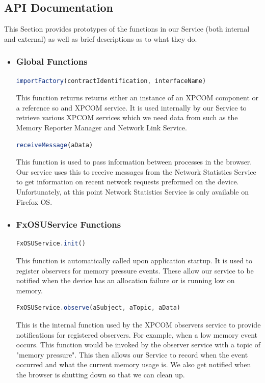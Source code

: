 \documentclass[12pt]{article}
\begin{document}
\subsection{API Documentation}
This Section provides prototypes of the functions in our Service (both internal and external) as well as brief descriptions as to what they do.
\begin{itemize}
\item \subsubsection{Global Functions}
\begin{lstlisting}[language=JavaScript]
importFactory(contractIdentification, interfaceName)
\end{lstlisting}
This function returns returns either an instance of an XPCOM component or a reference so and XPCOM service.  It is used internally by our Service to retrieve various XPCOM services which we need data from such as the Memory Reporter Manager and Network Link Service.  \\ 
\begin{lstlisting}[language=JavaScript]
receiveMessage(aData)
\end{lstlisting}
This function is used to pass information between processes in the browser.  Our service uses this to receive messages from the Network Statistics Service to get information on recent network requests preformed on the device.  Unfortunately, at this point Network Statistics Service is only available on Firefox OS. 
\item \subsubsection{FxOSUService Functions}
\begin{lstlisting}[language=JavaScript]
FxOSUService.init()
\end{lstlisting}  
This function is automatically called upon application startup.  It is used to register observers for memory pressure events.  These allow our service to be notified when the device has an allocation failure or is running low on memory.  \\
\begin{lstlisting}[language=JavaScript]
FxOSUService.observe(aSubject, aTopic, aData)
\end{lstlisting} 
This is the internal function used by the XPCOM observers service to provide notifications for registered observers. For example, when a low memory event occurs.  This function would be invoked by the observer service with a topic of "memory pressure".  This then allows our Service to record when the event occurred and what the current memory usage is.  We also get notified when the browser is shutting down so that we can clean up. \\

\end{itemize}
\end{document}
